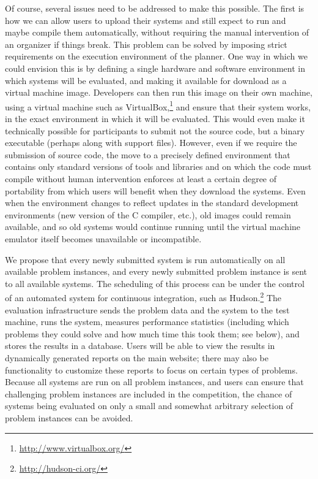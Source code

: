Of course, several issues need to be addressed to make this possible.
The first is how we can allow users to upload their systems and still
expect to run and maybe compile them automatically, without requiring
the manual intervention of an organizer if things break.  This problem
can be solved by imposing strict requirements on the execution
environment of the planner.  One way in which we could envision this
is by defining a single hardware and software environment in which
systems will be evaluated, and making it available for download as a
virtual machine image.  Developers can then run this image on their
own machine, using a virtual machine such as
VirtualBox,\footnote{\url{http://www.virtualbox.org/}} and ensure
that their system works, in the exact environment in which it will be
evaluated.  This would even make it technically possible for
participants to submit not the source code, but a binary executable
(perhaps along with support files).  However, even if we require the
submission of source code, the move to a precisely defined environment
that contains only standard versions of tools and libraries and on
which the code must compile without human intervention enforces at
least a certain degree of portability from which users will benefit
when they download the systems.  Even when the environment changes to
reflect updates in the standard development environments (new version
of the C compiler, etc.), old images could remain available, and so
old systems would continue running until the virtual machine emulator
itself becomes unavailable or incompatible.

We propose that every newly submitted system is run automatically on
all available problem instances, and every newly submitted problem
instance is sent to all available systems.  The scheduling of this
process can be under the control of an automated system for continuous
integration, such as Hudson.\footnote{\url{http://hudson-ci.org/}} The
evaluation infrastructure sends the problem data and the system to the
test machine, runs the system, measures performance statistics
(including which problems they could solve and how much time this took
them; see below), and stores the results in a database. Users will be
able to view the results in dynamically generated reports on the main
website; there may also be functionality to customize these reports to
focus on certain types of problems.  Because all systems are run on
all problem instances, and users can ensure that challenging problem
instances are included in the competition, the chance of systems being
evaluated on only a small and somewhat arbitrary selection of problem
instances \cite{pg2008002} can be avoided.

